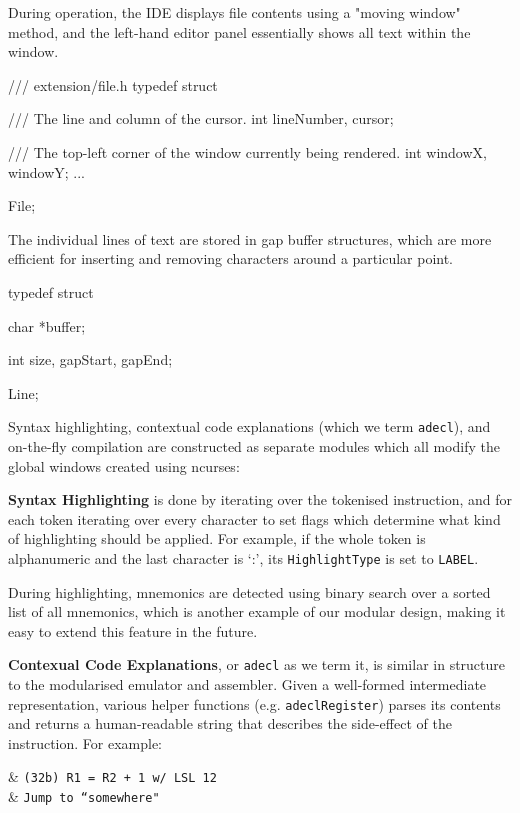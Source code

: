 \documentclass{ictex}
\begin{document}
During operation, the IDE displays file contents using a "moving window" method, and the left-hand editor panel essentially shows all text within the window.

\begin{code}
    /// extension/file.h
    typedef struct {
        /// The line and column of the cursor.
        int lineNumber, cursor;

        /// The top-left corner of the window currently being rendered.
        int windowX, windowY;
        ...
    } File;
\end{code}

The individual lines of text are stored in gap buffer structures, which are more efficient for inserting and removing characters around a particular point.

\begin{code}
    typedef struct{
        char *buffer;

        int size, gapStart, gapEnd;
    } Line;
\end{code}

Syntax highlighting, contextual code explanations (which we term \texttt{adecl}), and on-the-fly compilation are constructed as separate modules which all modify the global windows created using ncurses:

\textbf{Syntax Highlighting} is done by iterating over the tokenised instruction, and for each token iterating over every character to set flags which determine what kind of highlighting should be applied. For example, if the whole token is alphanumeric and the last character is `:', its \texttt{HighlightType} is set to \texttt{LABEL}.

During highlighting, mnemonics are detected using binary search over a sorted list of all mnemonics, which is another example of our modular design, making it easy to extend this feature in the future.

\textbf{Contexual Code Explanations}, or \texttt{adecl} as we term it, is similar in structure to the modularised emulator and assembler. Given a well-formed intermediate representation, various helper functions (e.g. \texttt{adeclRegister}) parses its contents and returns a human-readable string that describes the side-effect of the instruction. For example:

\vspace{-1em} \begin{center} \begin{textAlign}[ll]
     & \texttt{(32b) R1 = R2 + 1 w/ LSL 12} \\
     & \texttt{Jump to ``somewhere"} \\
\end{textAlign} \end{center} \vspace{-1em}
\end{document}
